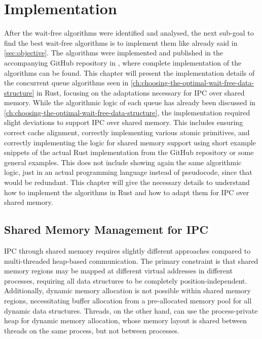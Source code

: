 \chapter{Implementation}\label{ch:implementation}

After the wait-free algorithms were identified and analysed, the next sub-goal to find the best wait-free algorithms is to implement them like already said in \cref{sec:objective}. The algorithms were implemented and published in the accompanying GitHub repository in \cite{githubMA}, where complete implementation of the algorithms can be found. This chapter will present the implementation details of the concurrent queue algorithms seen in \cref{ch:choosing-the-optimal-wait-free-data-structure} in Rust, focusing on the adaptations necessary for \ac{IPC} over shared memory. While the algorithmic logic of each queue has already been discussed in \cref{ch:choosing-the-optimal-wait-free-data-structure}, the implementation required slight deviations to support \ac{IPC} over shared memory. This includes ensuring correct cache alignment, correctly implementing various atomic primitives, and correctly implementing the logic for shared memory support using short example snippets of the actual Rust implementation from the GitHub repository or some general examples. This does not include showing again the same algorithmic logic, just in an actual programming language instead of pseudocode, since that would be redundant. This chapter will give the necessary details to understand how to implement the algorithms in Rust and how to adapt them for \ac{IPC} over shared memory.

\section{Shared Memory Management for \acf{IPC}}

\ac{IPC} through shared memory requires slightly different approaches compared to multi-threaded heap-based communication. The primary constraint is that shared memory regions may be mapped at different virtual addresses in different processes, requiring all data structures to be completely position-independent. Additionally, dynamic memory allocation is not possible within shared memory regions, necessitating buffer allocation from a pre-allocated memory pool for all dynamic data structures. Threads, on the other hand, can use the process-private heap for dynamic memory allocation, whose memory layout is shared between threads on the same process, but not between processes.  

